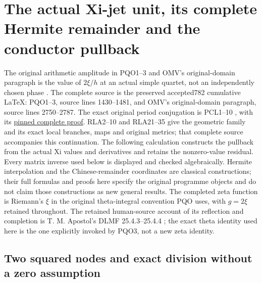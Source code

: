 \documentclass[11pt]{article}
\begin{document}
\section{The actual Xi-jet unit, its complete Hermite remainder and the conductor pullback}
\label{sec:actual-unit-hermite}

The original arithmetic amplitude in PQO1--3 and OMV's original-domain
paragraph is the value of $2\xi/h$ at an actual simple quartet,
not an independently chosen phase \cite{Cumulative}.
The complete source is the preserved accepted782 cumulative LaTeX:
PQO1--3, source lines 1430--1481, and OMV's original-domain paragraph,
source lines 2750--2787.
The exact original period conjugation is PCL1--10
\cite{PCLOriginal}, with its
\href{https://github.com/KokunoYumeto/zeta-function-research-reader/blob/487253b5b01851da5b9b98af4e146fecf1fab902/workbenches/splitzero-tandem/continuations/20260919-native-conductor-coprimality/providers/PCL_COMPLETE.tex#L19}{pinned complete proof}.
RLA2--10 and RLA21--35 \cite{RLA008} give the geometric family and
its exact local branches, maps and original metrics; that complete
source accompanies this continuation.
The following calculation constructs the pullback from the actual
Xi values and derivatives and retains the nonzero-value residual.
Every matrix inverse used below is displayed and checked algebraically.
Hermite interpolation and the Chinese-remainder coordinates are
classical constructions; their full formulas and proofs here specify
the original programme objects and do not claim those constructions
as new general results.  The completed zeta function is Riemann's
$\xi$ in the original theta-integral convention PQO uses, with
$g=2\xi$ retained throughout.  The retained human-source account
of its reflection and completion is T. M. Apostol's DLMF
25.4.3--25.4.4 \cite{DLMFXi}; the exact theta identity used here
is the one explicitly invoked by PQO3, not a new zeta identity.

\subsection{Two squared nodes and exact division without a zero assumption}
\end{document}
